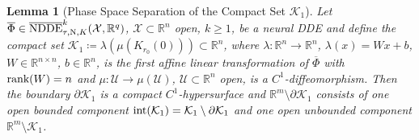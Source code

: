 \documentclass[10pt]{article}
\numberwithin{equation}{section}
\newtheorem{lemma}[theorem]{Lemma}
\begin{document}
	
	\begin{lemma}[Phase Space Separation of the Compact Set $\mathcal{K}_1$] \label{lem:Khypersurface}
		Let  $\overline{\Phi}\in\overline{\textup{NDDE}}^k_{\tau,\textup{N},K}(\mathcal{X},\mathbb{R}^q)$, $\mathcal{X}\subset \mathbb{R}^n$ open, $k \geq 1$, be a neural DDE and define the compact set $\mathcal{K}_1 \coloneqq  \lambda(\mu(K_{r_0}(0))) \subset \mathbb{R}^n$, where $\lambda:\mathbb{R}^n\rightarrow \mathbb{R}^n$, $\lambda(x) = Wx+b$, $W \in \mathbb{R}^{n \times n}$, $b\in \mathbb{R}^n$, is the first affine linear transformation of $\overline{\Phi}$ with $\textup{rank}(W) = n$ and $\mu:\mathcal{U}\rightarrow \mu(\mathcal{U})$, $\mathcal{U}\subset \mathbb{R}^n$ open, is a $C^1$-diffeomorphism. Then the boundary $\partial \mathcal{K}_1$ is a compact $C^1$-hypersurface and $\mathbb{R}^m\setminus \partial \mathcal{K}_1$ consists of one open bounded component $\textup{int}(\mathcal{K}_1) = \mathcal{K}_1\setminus \partial \mathcal{K}_1$ and one open unbounded component $\mathbb{R}^m\setminus \mathcal{K}_1$.
	\end{lemma}
	
\end{document}
